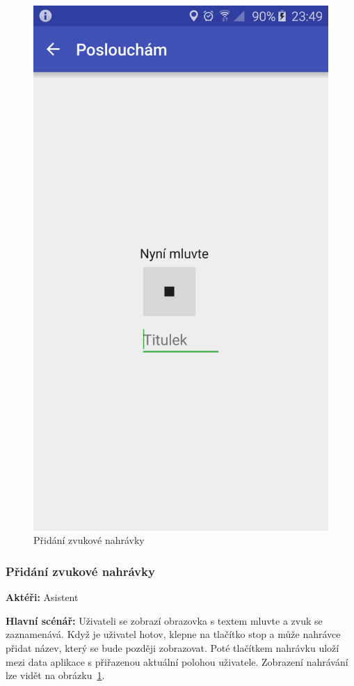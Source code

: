 \documentclass{article}
\newcommand{\usecase}[2]{\subsubsection{#1}\label{#2}}
\begin{document}
\begin{figure}[H]
\begin{minipage}{.5\textwidth}
                     \includegraphics[scale=0.14]{img/screen/nahravaninahravky.png}
             \caption{Přidání zvukové nahrávky}
             \label{fig:pridaninahravky}

       \end{minipage}
\end{figure}

\usecase{Přidání zvukové nahrávky}{pridaninahravky}
\textbf{Aktéři:} Asistent

\vspace{0.1cm}
\noindent
\textbf{Hlavní scénář:} Uživateli se zobrazí obrazovka s textem mluvte a zvuk se zaznamenává.
Když je uživatel hotov, klepne na tlačítko stop a může nahrávce přidat název, který se bude později zobrazovat.
Poté tlačítkem nahrávku uloží mezi data aplikace s přiřazenou aktuální polohou uživatele.
Zobrazení nahrávání lze vidět na obrázku~\ref{fig:pridaninahravky}.
\end{document}
